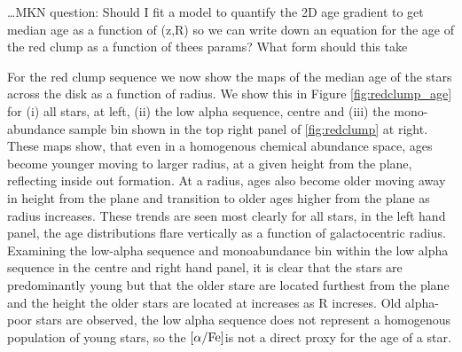 \documentclass[12pt, preprint]{aastex}
\newcommand{\feh}{\mbox{$\rm [Fe/H]$}}
\newcommand{\alphafe}{\mbox{$\rm [\alpha/Fe]$}}
\begin{document}
\ldots MKN question: Should I fit a model to quantify the 2D age gradient to get median age as a function of (z,R) so we can write down an equation for the age of the red clump as a function of thees params? What form should this take


For the red clump sequence we now show the maps of the median age of the stars across the disk as a function of radius. We show this in Figure \ref{fig:redclump_age} for (i) all stars, at left, (ii) the low alpha sequence, centre and (iii) the mono-abundance sample bin shown in the top right panel of \ref{fig:redclump} at right. These maps show, that even in a homogenous chemical abundance space, ages become younger moving to larger radius, at a given height from the plane, reflecting inside out formation. At a radius, ages also become older moving away in height from the plane and transition to older ages higher from the plane as radius increases. These trends are seen most clearly for all stars, in the left hand panel, the age distributions flare vertically as a function of galactocentric radius. Examining the low-alpha sequence and monoabundance bin within the low alpha sequence in the centre and right hand panel, it is clear that the stars are predominantly young but that the older stare are located furthest from the plane and the height the older stars are located at increases as R increses. Old alpha-poor stars are observed, the low alpha sequence does not represent a homogenous population of young stars, so the \alphafe is not a direct proxy for the age of a star. 

%
\end{document}
